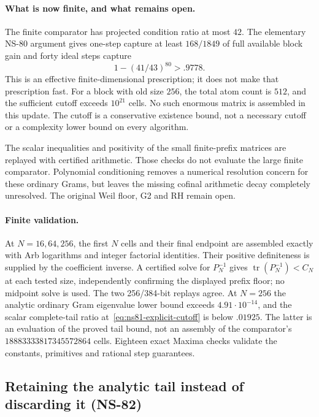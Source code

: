 \documentclass[11pt]{article}
\theoremstyle{remark}
\begin{document}
\paragraph{What is now finite, and what remains open.}
The finite comparator has projected condition ratio at most $42$.
The elementary NS-80 argument gives one-step capture at least
$168/1849$ of full available block gain and forty ideal steps capture
\[
 1-(41/43)^{80}>.9778.
\]
This is an effective finite-dimensional prescription; it does not make
that prescription fast. For a block with old size $256$, the total atom
count is $512$, and the sufficient cutoff exceeds $10^{21}$ cells.
No such enormous matrix is assembled in this update. The cutoff is a
conservative existence bound, not a necessary cutoff or a complexity
lower bound on every algorithm.

The scalar inequalities and positivity of the small finite-prefix matrices
are replayed with certified arithmetic. Those checks do not evaluate the
large finite comparator. Polynomial conditioning removes a numerical
resolution concern for these ordinary Grams, but leaves the missing
cofinal arithmetic decay completely unresolved. The original Weil floor,
G2 and RH remain open.

\paragraph{Finite validation.}
At $N=16,64,256$, the first $N$ cells and their final endpoint are
assembled exactly with Arb logarithms and integer factorial identities.
Their positive definiteness is supplied by the coefficient inverse.
A certified solve for $P_N^{-1}$ gives
$\operatorname{tr}(P_N^{-1})<C_N$ at each tested size, independently
confirming the displayed prefix floor; no midpoint solve is used.
The two 256/384-bit replays agree. At $N=256$ the analytic ordinary
Gram eigenvalue lower bound exceeds $4.91\cdot10^{-14}$, and the scalar
complete-tail ratio at~\eqref{eq:ns81-explicit-cutoff} is below $.01925$.
The latter is an evaluation of the proved tail bound, not an assembly
of the comparator's $18883333817345572864$ cells. Eighteen exact Maxima
checks validate the constants, primitives and rational step guarantees.

\subsection{Retaining the analytic tail instead of discarding it (NS-82)}
\label{sec:ns82-tail-compression}
\end{document}
